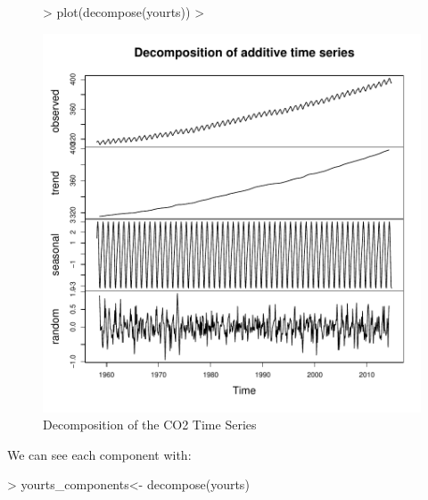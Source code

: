 \documentclass[11pt, a4paper]{article} %
\begin{document}
\begin{figure}[H]
\centering
\begin{Schunk}
\begin{Sinput}
> plot(decompose(yourts)) 
> 
\end{Sinput}
\end{Schunk}
\includegraphics{sweaveclean-decompose}
\caption{Decomposition of the CO2 Time Series}
\end{figure}


\noindent We can see each component with:
\begin{Schunk}
\begin{Sinput}
> yourts_components<- decompose(yourts)
\end{Sinput}
\end{Schunk}
\begin{Schunk}
\end{Schunk}
\end{document}
